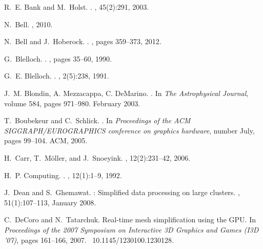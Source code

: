 \documentclass[10pt,journal,cspaper,compsoc]{IEEEtran}
\begin{document}
\begin{thebibliography}{10}

R.~E. Bank and M.~Holst.
.
, 45(2):291, 2003.

N.~Bell.
, 2010.

N.~Bell and J.~Hoberock.
.
, pages 359--373, 2012.

G.~Blelloch.
.
, pages 35--60, 1990.

G.~E. Blelloch.
.
, 2(5):238, 1991.

J.~M. Blondin, A. Mezzacappa, C. DeMarino.
.
\newblock In {\em The Astrophysical Journal}, volume 584, pages 971--980. February 2003.

T.~Boubekeur and C.~Schlick.
.
\newblock In {\em Proceedings of the ACM SIGGRAPH/EUROGRAPHICS conference on
  graphics hardware}, number July, pages 99--104. ACM, 2005.

H.~Carr, T.~M\"{o}ller, and J.~Snoeyink.
,
  12(2):231--42, 2006.

H.~P. Computing.
.
, 12(1):1--9, 1992.

J.~Dean and S.~Ghemawat.
: Simplified data processing on large clusters.
, 51(1):107--113, January 2008.

C.~DeCoro and N.~Tatarchuk.
\newblock Real-time mesh simplification using the {GPU}.
\newblock In {\em Proceedings of the 2007 Symposium on Interactive 3D Graphics
  and Games (I3D '07)}, pages 161--166, 2007.
~10.1145/1230100.1230128.


\end{thebibliography}
\end{document}
